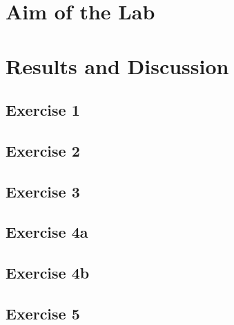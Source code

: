 







\tableofcontents
\pagebreak


\newpage\section{Aim of the Lab}


\newpage\section{Results and Discussion}

\subsection{Exercise 1}


\subsection{Exercise 2}

\subsection{Exercise 3}

\subsection{Exercise 4a}

\subsection{Exercise 4b}

\subsection{Exercise 5}

